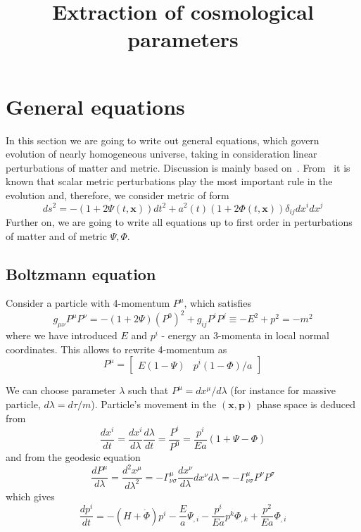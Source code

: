 \documentclass[12pt]{extarticle}
\title{Extraction of cosmological parameters}
\date{}
\numberwithin{problem}{section}
\numberwithin{theorem}{section}
\begin{document}
	\vspace{-3cm}
	\maketitle
	\section{General equations}
	In this section we are going to write out general equations, which govern evolution of nearly homogeneous universe, taking in consideration linear perturbations of matter and metric. Discussion is mainly based on~\cite{dodelson:2003}. From~\cite{gorbunov-rubakov:2011} it is known that scalar metric perturbations play the most important rule in the evolution and, therefore, we consider metric of form
	\begin{equation}
		ds^2 = -(1 + 2\Psi(t, \mathbf{x}))dt^2 + a^2(t)(1 + 2\Phi(t, \mathbf{x}))\delta_{ij}dx^idx^j	
	\end{equation}
	Further on, we are going to write all equations up to first order in perturbations of matter and of metric $\Psi, \Phi$.
	
	\subsection{Boltzmann equation}
	Consider a particle with 4-momentum $P^\mu$, which satisfies 
	\begin{equation}
		g_{\mu\nu} P^\mu P^\nu = -(1 + 2\Psi)(P^0)^2 + g_{ij}P^iP^j \equiv -E^2 + p^2 = -m^2
	\end{equation}
	where we have introduced $E$ and $p^i$ - energy an 3-momenta in local normal coordinates. This allows to rewrite 4-momentum as 
	\begin{equation}
		P^\mu = \begin{bmatrix}
			E(1 - \Psi) & p^i(1 - \Phi) / a
		\end{bmatrix}
	\end{equation}
	
	We can choose parameter $\lambda$ such that $P^\mu = dx^\mu/d\lambda$ (for instance for massive particle, $d\lambda = d\tau/m$). Particle's movement in the $(\mathbf{x},\mathbf{p})$ phase space is deduced from
	\begin{equation}
		\label{eq:boltzmann:position}
		\frac{dx^i}{dt} = \frac{dx^i}{d\lambda}\frac{d\lambda}{dt} = \frac{P^i}{P^0} = \frac{p^i}{Ea}(1+\Psi-\Phi)
	\end{equation}
	and from the geodesic equation
	\begin{equation}
		\label{eq:boltzmann:momentum}
		\frac{dP^\mu}{d\lambda} = \frac{d^2x^\mu}{d\lambda^2} = -\Gamma^\mu_{\nu\sigma}\frac{dx^\nu}{d\lambda}{dx^\nu}{d\lambda} = -\Gamma^\mu_{\nu\sigma}P^\nu P^\sigma
	\end{equation}
	which gives
	\begin{equation}
		\frac{dp^i}{dt} = -(H + \dot{\Phi})p^i - \frac{E}{a}\Psi_{,i} - \frac{p^i}{Ea}p^k\Phi_{,k} + \frac{p^2}{Ea}\Phi_{,i}
	\end{equation}
\end{document}
